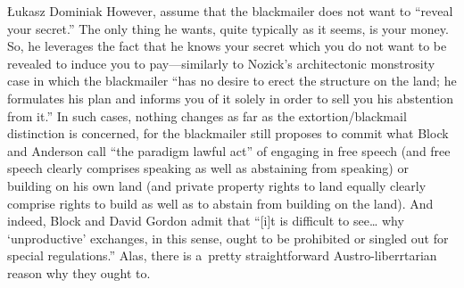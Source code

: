 \begin{artengenv}{Łukasz Dominiak}
However, assume that the blackmailer does not want to ``reveal your secret.'' The only thing he wants, quite typically as it seems, is your money. So, he leverages the fact that he knows your secret which you do not want to be revealed to induce you to pay---similarly to Nozick's 
\parencite*[][pp.84–85]{nozick_anarchy_1974} %
 architectonic monstrosity case in which the blackmailer ``has no desire to erect the structure on the land; he formulates his plan and informs you of it solely in order to sell you his abstention from it.'' In such cases, nothing changes as far as the extortion/blackmail distinction is concerned, for the blackmailer still proposes to commit what Block and Anderson 
\parencite*[][p.546]{block_blackmail_2000} %
 call ``the paradigm lawful act'' of engaging in free speech (and free speech clearly comprises speaking as well as abstaining from speaking) or building on his own land (and private property rights to land equally clearly comprise rights to build as well as to abstain from building on the land). And indeed, Block and David Gordon 
\parencite*[][p.49]{block_blackmail_1985} %
 admit that ``[i]t is difficult to see… why ‘unproductive' exchanges, in this sense, ought to be prohibited or singled out for special regulations.'' Alas, there is a~pretty straightforward Austro-liberrtarian reason why they ought to.




\end{artengenv}
